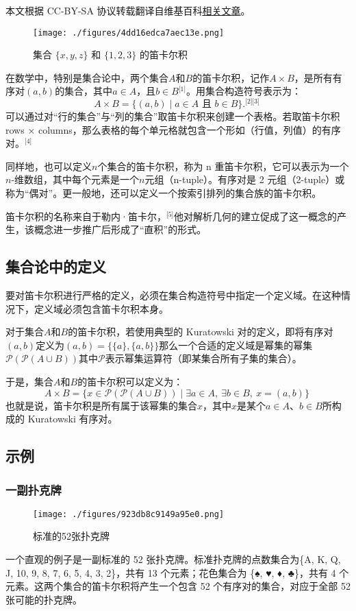 
本文根据 CC-BY-SA 协议转载翻译自维基百科\href{https://en.wikipedia.org/wiki/Cartesian_product}{相关文章}。

\begin{figure}[ht]
\centering
\texttt{[image: ./figures/4dd16edca7aec13e.png]}
\caption{集合 \( \{x, y, z\} \) 和 \( \{1, 2, 3\} \) 的笛卡尔积} \label{fig_DKR_4}
\end{figure}
在数学中，特别是集合论中，两个集合\(A\)和\(B\)的笛卡尔积，记作\( A \times B \)，是所有有序对\( (a, b) \)的集合，其中\( a \in A \)，且\( b \in B \)\(^\text{[1]}\)。用集合构造符号表示为：  
\[
A \times B = \{ (a, b) \mid a \in A \text{ 且 } b \in B \}.^\text{[2][3]}~
\]
可以通过对“行的集合”与“列的集合”取笛卡尔积来创建一个表格。若取笛卡尔积 rows × columns，那么表格的每个单元格就包含一个形如（行值，列值）的有序对。\(^\text{[4]}\)

同样地，也可以定义\(n\)个集合的笛卡尔积，称为 n 重笛卡尔积，它可以表示为一个\(n\)-维数组，其中每个元素是一个\(n\)元组（n-tuple）。有序对是 2 元组（2-tuple）或称为“偶对”。更一般地，还可以定义一个按索引排列的集合族的笛卡尔积。

笛卡尔积的名称来自于勒内·笛卡尔，\(^\text{[5]}\)他对解析几何的建立促成了这一概念的产生，该概念进一步推广后形成了“直积”的形式。
\subsection{集合论中的定义}
要对笛卡尔积进行严格的定义，必须在集合构造符号中指定一个定义域。在这种情况下，定义域必须包含笛卡尔积本身。

对于集合\( A \)和\( B \)的笛卡尔积，若使用典型的 Kuratowski 对的定义，即将有序对\( (a, b) \)定义为\((a, b) = \{\{a\}, \{a, b\}\}\)那么一个合适的定义域是幂集的幂集\(\mathcal{P}(\mathcal{P}(A \cup B))\)其中\( \mathcal{P} \)表示幂集运算符（即某集合所有子集的集合）。

于是，集合\( A \)和\( B \)的笛卡尔积可以定义为：  
\[
A \times B = \{ x \in \mathcal{P}(\mathcal{P}(A \cup B)) \mid \exists a \in A,\ \exists b \in B,\ x = (a, b) \}~
\]  
也就是说，笛卡尔积是所有属于该幂集的集合\( x \)，其中\( x \)是某个\( a \in A \)、\( b \in B \)所构成的 Kuratowski 有序对。
\subsection{示例}  
\subsubsection{一副扑克牌}
\begin{figure}[ht]
\centering
\texttt{[image: ./figures/923db8c9149a95e0.png]}
\caption{标准的52张扑克牌} \label{fig_DKR_1}
\end{figure}
一个直观的例子是一副标准的 52 张扑克牌。标准扑克牌的点数集合为\{A, K, Q, J, 10, 9, 8, 7, 6, 5, 4, 3, 2\}，共有 13 个元素；花色集合为 \{♠, ♥, ♦, ♣\}，共有 4 个元素。这两个集合的笛卡尔积将产生一个包含 52 个有序对的集合，对应于全部 52 张可能的扑克牌。

